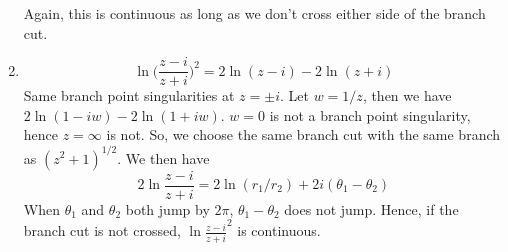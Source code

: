 \documentclass[a4paper]{article}
\begin{document}
\begin{ans}
\begin{enumerate}[label=(\roman*)]
\begin{center}
\end{center}
Again, this is continuous as long as we don't cross either side of the branch cut.
\item 
$$\ln\bigg(\frac{z-i}{z+i}\bigg)^2=2\ln(z-i)-2\ln(z+i)$$
Same branch point singularities at $z=\pm i$. Let $w=1/z$, then we have $2\ln(1-iw)-2\ln(1+iw)$. $w=0$ is not a branch point singularity, hence $z=\infty$ is not. So, we choose the same branch cut with the same branch as $(z^2+1)^{1/2}$. We then have
$$2\ln\frac{z-i}{z+i}=2\ln(r_1/r_2)+2i(\theta_1-\theta_2)$$
When $\theta_1$ and $\theta_2$ both jump by $2\pi$, $\theta_1-\theta_2$ does not jump. Hence, if the branch cut is not crossed, $\ln\frac{z-i}{z+i}^2$ is continuous.
\end{enumerate}
\end{ans}
\newpage
\end{document}
